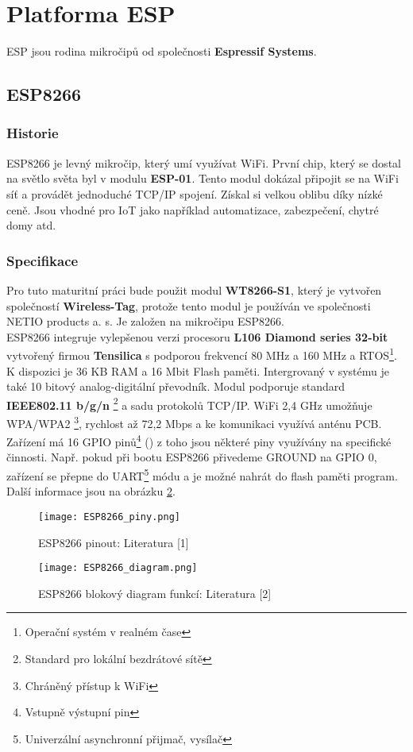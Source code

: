 \documentclass[a4paper, 12pt]{report}
\begin{document}
		\section{Platforma ESP}
			ESP jsou rodina mikročipů od společnosti \textbf{Espressif Systems}.
			\subsection{ESP8266}

				\subsubsection{Historie}
					ESP8266 je levný mikročip, který umí využívat WiFi. První chip, který se dostal na světlo světa byl v modulu \textbf{ESP-01}. Tento modul dokázal připojit se na WiFi síť a provádět jednoduché TCP/IP spojení. Získal si velkou oblibu díky nízké ceně. Jsou vhodné pro IoT jako například automatizace, zabezpečení, chytré domy atd.
				\subsubsection{Specifikace}
					Pro tuto maturitní práci bude použit modul \textbf{WT8266-S1}, který je vytvořen společností \textbf{Wireless-Tag}, protože tento modul je používán ve společnosti NETIO products a. s. Je založen na mikročipu ESP8266.\\
					ESP8266 integruje vylepšenou verzi procesoru \textbf{L106 Diamond series 32-bit} vytvořený firmou \textbf{Tensilica} s podporou frekvencí 80 \si{MHz} a 160 \si{MHz} a RTOS\footnote{Operační systém v realném čase}.
					K dispozici je 36 \si{KB} RAM a 16 \si{Mbit} Flash paměti. Intergrovaný v systému je také 10 bitový analog-digitální převodník. Modul podporuje standard {\bf IEEE802.11 b/g/n}	\footnote{Standard pro lokální bezdrátové sítě} a sadu protokolů TCP/IP. WiFi 2,4 \si{GHz} umožňuje WPA/WPA2 \footnote{Chráněný přístup k WiFi}, rychlost až 72,2 \si{Mbps} a ke komunikaci využívá anténu PCB. Zařízení má 16 GPIO pinů\footnote{Vstupně výstupní pin} () z toho jsou některé piny využívány na specifické činnosti. Např. pokud při bootu ESP8266 přivedeme GROUND na GPIO 0, zařízení se přepne do UART\footnote{Univerzální asynchronní přijmač, vysílač} módu a je možné nahrát do flash paměti program. Další informace jsou na obrázku \ref{ESP8266_diagram}.

					\begin{figure}[h]
						\centering
						\texttt{[image: ESP8266\_piny.png]}
						\caption{ESP8266 pinout: Literatura [1]}
						\label{ESP8266_piny}
					\end{figure}
					\begin{figure}[h]
						\centering
						\texttt{[image: ESP8266\_diagram.png]}
						\caption{ESP8266 blokový diagram funkcí: Literatura [2]}
						\label{ESP8266_diagram}
					\end{figure}
\end{document}
